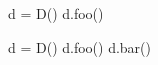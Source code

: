 \documentclass[multi, border=6]{standalone}
\begin{document}
\begin{fixedheightcode}
d = D()
d.foo() 
\end{fixedheightcode}

\begin{fixedheightcode}
d = D()
d.foo() 
d.bar()
\end{fixedheightcode}
\end{document}
